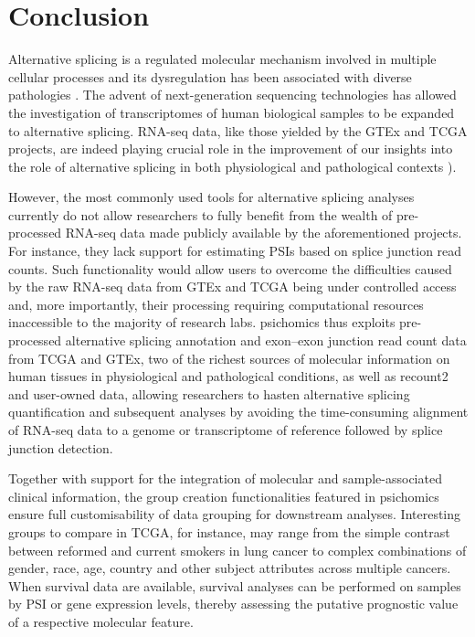 \section{Conclusion}

Alternative splicing is a regulated molecular mechanism involved in multiple cellular processes and its dysregulation has been associated with diverse pathologies \cite{kelemen:2013tc,paronetto:2016vw,wang:2008wa,oltean:2014vm}. The advent of next-generation sequencing technologies has allowed the investigation of transcriptomes of human biological samples to be expanded to alternative splicing. RNA-seq data, like those yielded by the GTEx and TCGA projects, are indeed playing crucial role in the improvement of our insights into the role of alternative splicing in both physiological and pathological contexts \cite{paronetto:2016vw,wang:2008wa,gallego-paez:2017wc,tsai:2015ve,danan-gotthold:2015ut}).

However, the most commonly used tools for alternative splicing analyses currently do not allow researchers to fully benefit from the wealth of pre-processed RNA-seq data made publicly available by the aforementioned projects. For instance, they lack support for estimating PSIs based on splice junction read counts. Such functionality would allow users to overcome the difficulties caused by the raw RNA-seq data from GTEx and TCGA being under controlled access and, more importantly, their processing requiring computational resources inaccessible to the majority of research labs. psichomics thus exploits pre-processed alternative splicing annotation and exon–exon junction read count data from TCGA and GTEx, two of the richest sources of molecular information on human tissues in physiological and pathological conditions, as well as recount2 and user-owned data, allowing researchers to hasten alternative splicing quantification and subsequent analyses by avoiding the time-consuming alignment of RNA-seq data to a genome or transcriptome of reference followed by splice junction detection.

Together with support for the integration of molecular and sample-associated clinical information, the group creation functionalities featured in psichomics ensure full customisability of data grouping for downstream analyses. Interesting groups to compare in TCGA, for instance, may range from the simple contrast between reformed and current smokers in lung cancer to complex combinations of gender, race, age, country and other subject attributes across multiple cancers. When survival data are available, survival analyses can be performed on samples by PSI or gene expression levels, thereby assessing the putative prognostic value of a respective molecular feature.

